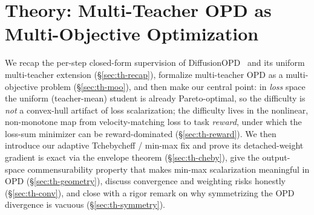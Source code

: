 %
\ifdefined\theoremstyleisset\else
  \theoremstyle{plain}
  \newtheorem{theorem}{Theorem}
  \newtheorem{proposition}{Proposition}
  \newtheorem{lemma}{Lemma}
  \theoremstyle{definition}
  \newtheorem{definition}{Definition}
  \newtheorem{assumption}{Assumption}
  \theoremstyle{remark}
  \newtheorem{remark}{Remark}
  \let\theoremstyleisset\relax
\fi

\section{Theory: Multi-Teacher OPD as Multi-Objective Optimization}
\label{sec:theory}

We recap the per-step closed-form supervision of DiffusionOPD~\cite{diffusionopd}
and its uniform multi-teacher extension (\S\ref{sec:th-recap}), formalize
multi-teacher OPD as a multi-objective problem (\S\ref{sec:th-moo}), and then make
our central point: in \emph{loss} space the uniform (teacher-mean) student is already
Pareto-optimal, so the difficulty is \emph{not} a convex-hull artifact of loss
scalarization; the difficulty lives in the nonlinear, non-monotone map from
velocity-matching loss to task \emph{reward}, under which the loss-sum minimizer can be
reward-dominated (\S\ref{sec:th-reward}). We then introduce our adaptive
Tchebycheff / min-max fix and prove its detached-weight gradient is exact via the
envelope theorem (\S\ref{sec:th-cheby}), give the output-space commensurability property
that makes min-max scalarization meaningful in OPD (\S\ref{sec:th-geometry}), discuss
convergence and weighting risks honestly (\S\ref{sec:th-conv}), and close with a rigor
remark on why symmetrizing the OPD divergence is vacuous (\S\ref{sec:th-symmetry}).

